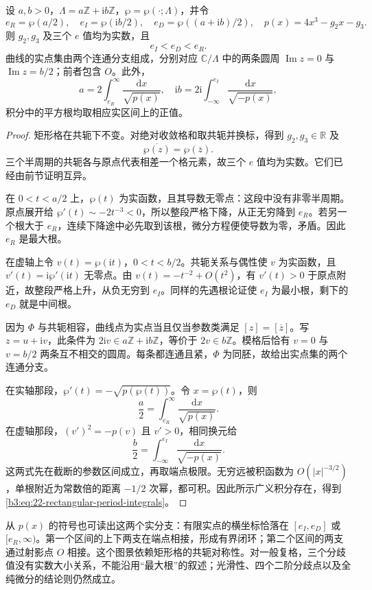 \begin{proposition}[矩形格的实分支与周期积分]\label{b3:prop:22-rectangular-real-locus}
设 \(a,b>0\)，\(\Lambda=a\mathbb Z+\mathrm ib\mathbb Z\)，\(\wp=\wp(\cdot;\Lambda)\)，并令
\[
 e_R=\wp(a/2),\quad e_I=\wp(\mathrm ib/2),\quad
 e_D=\wp((a+\mathrm ib)/2),\quad p(x)=4x^3-g_2x-g_3.
\]
则 \(g_2,g_3\) 及三个 \(e\) 值均为实数，且
\[
 e_I<e_D<e_R.
\]
曲线的实点集由两个连通分支组成，分别对应 \(\mathbb C/\Lambda\) 中的两条圆周 \(\operatorname{Im}z=0\) 与 \(\operatorname{Im}z=b/2\)；前者包含 \(O\)。此外，
\begin{equation}\label{b3:eq:22-rectangular-period-integrals}
 a=2\int_{e_R}^\infty\frac{\mathrm dx}{\sqrt{p(x)}},\quad
 \mathrm ib=2\mathrm i\int_{-\infty}^{e_I}\frac{\mathrm dx}{\sqrt{-p(x)}},
\end{equation}
积分中的平方根均取相应实区间上的正值。
\end{proposition}
\begin{proof}
矩形格在共轭下不变。对绝对收敛格和取共轭并换标，得到 \(g_2,g_3\in\mathbb R\) 及
\[
 \overline{\wp(z)}=\wp(\overline z).
\]
三个半周期的共轭各与原点代表相差一个格元素，故三个 \(e\) 值均为实数。它们已经由前节证明互异。

在 \(0<t<a/2\) 上，\(\wp(t)\) 为实函数，且其导数无零点：这段中没有非零半周期。原点展开给 \(\wp'(t)\sim-2t^{-3}<0\)，所以整段严格下降，从正无穷降到 \(e_R\)。若另一个根大于 \(e_R\)，连续下降途中必先取到该根，微分方程便使导数为零，矛盾。因此 \(e_R\) 是最大根。

在虚轴上令 \(v(t)=\wp(\mathrm it)\)，\(0<t<b/2\)。共轭关系与偶性使 \(v\) 为实函数，且 \(v'(t)=\mathrm i\wp'(\mathrm it)\) 无零点。由 \(v(t)=-t^{-2}+O(t^2)\)，有 \(v'(t)>0\) 于原点附近，故整段严格上升，从负无穷到 \(e_I\)。同样的先遇根论证使 \(e_I\) 为最小根，剩下的 \(e_D\) 就是中间根。

因为 \(\Phi\) 与共轭相容，曲线点为实点当且仅当参数类满足 \([z]=[\overline z]\)。写 \(z=u+\mathrm iv\)，此条件为 \(2\mathrm iv\in a\mathbb Z+\mathrm ib\mathbb Z\)，等价于 \(2v\in b\mathbb Z\)。模格后恰有 \(v=0\) 与 \(v=b/2\) 两条互不相交的圆周。每条都连通且紧，\(\Phi\) 为同胚，故给出实点集的两个连通分支。

在实轴那段，\(\wp'(t)=-\sqrt{p(\wp(t))}\)。令 \(x=\wp(t)\)，则
\[
 \frac a2=\int_{e_R}^{\infty}\frac{\mathrm dx}{\sqrt{p(x)}}.
\]
在虚轴那段，\((v')^2=-p(v)\) 且 \(v'>0\)，相同换元给
\[
 \frac b2=\int_{-\infty}^{e_I}\frac{\mathrm dx}{\sqrt{-p(x)}}.
\]
这两式先在截断的参数区间成立，再取端点极限。无穷远被积函数为 \(O(|x|^{-3/2})\)，单根附近为常数倍的距离 \(-1/2\) 次幂，都可积。因此所示广义积分存在，得到\eqref{b3:eq:22-rectangular-period-integrals}。
\end{proof}

从 \(p(x)\) 的符号也可读出这两个实分支：有限实点的横坐标恰落在 \([e_I,e_D]\) 或 \([e_R,\infty)\)。第一个区间的上下两支在端点相接，形成有界闭环；第二个区间的两支通过射影点 \(O\) 相接。这个图景依赖矩形格的共轭对称性。对一般复格，三个分歧值没有实数大小关系，不能沿用“最大根”的叙述；光滑性、四个二阶分歧点以及全纯微分的结论则仍然成立。

